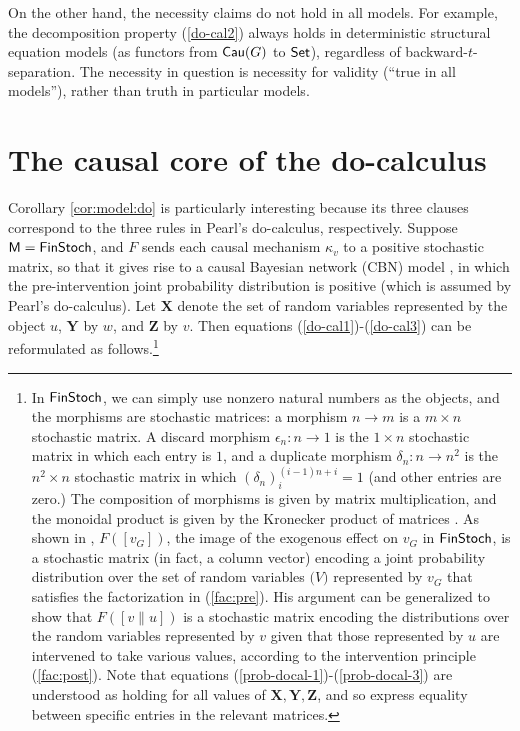 \documentclass[12pt]{amsart}
\theoremstyle{plain}
\theoremstyle{definition}
\theoremstyle{remark}
\numberwithin{equation}{section}
\theoremstyle{plain}
\newcommand{\0}{\emptyset}
\newcommand{\fun}{\longrightarrow}
\newcommand{\cat}[1]{\textup{\textsf{#1}}}
\DeclareMathOperator{\cau}{\sf{Cau}}
\begin{document}
On the other hand, the necessity claims do not hold in all models. For example, the decomposition property (\ref{do-cal2}) always holds in deterministic structural equation models (as functors from $\cau(G)$ to $\cat{Set}$), regardless of backward-$t$-separation. The necessity in question is necessity for validity (``true in all models''), rather than truth in particular models.

\section{The causal core of the do-calculus}
\label{sec:cal}
Corollary \ref{cor:model:do} is particularly interesting because its three clauses correspond to the three rules in Pearl's do-calculus, respectively. Suppose $\cat M = \cat{FinStoch}$, and $F$ sends each causal mechanism $\kappa_v$ to a positive stochastic matrix, so that it gives rise to a causal Bayesian network (CBN) model \cite{Fong:thesis}, in which the pre-intervention joint probability distribution is positive (which is assumed by Pearl's do-calculus). Let $\mathbf{X}$ denote the set of random variables represented by the object $u$, $\mathbf{Y}$ by $w$, and $\mathbf{Z}$ by $v$. Then equations (\ref{do-cal1})-(\ref{do-cal3}) can be reformulated as follows.\footnote{In $\cat{FinStoch}$, we can simply use nonzero natural numbers as the objects, and the morphisms are stochastic matrices: a morphism $n\fun m$ is a $m\times n$ stochastic matrix. A discard morphism $\epsilon_n: n\fun 1$ is the $1\times n$ stochastic matrix in which each entry is $1$, and a duplicate morphism $\delta_n : n \fun n^2$ is the $n^2\times n$ stochastic matrix in which $(\delta_n)^{(i - 1)n + i}_{i} = 1$ (and other entries are zero.) The composition of morphisms is given by matrix multiplication, and the monoidal product is given by the Kronecker product of matrices \cite{Fong:thesis,fritz2020synthetic}. As shown in \cite{Fong:thesis}, $F([v_G])$, the image of the exogenous effect on $v_G$ in $\cat{FinStoch}$, is a stochastic matrix (in fact, a column vector) encoding a joint probability distribution over the set of random variables $\mathbf(V)$ represented by $v_G$ that satisfies the factorization in (\ref{fac:pre}). His argument can be generalized to show that $F([v\|u])$ is a stochastic matrix encoding the distributions over the random variables represented by $v$ given that those represented by $u$ are intervened to take various values, according to the intervention principle (\ref{fac:post}). Note that equations (\ref{prob-docal-1})-(\ref{prob-docal-3}) are understood as holding for all values of $\mathbf{X}, \mathbf{Y}, \mathbf{Z}$, and so express equality between specific entries in the relevant matrices.}
\end{document}
